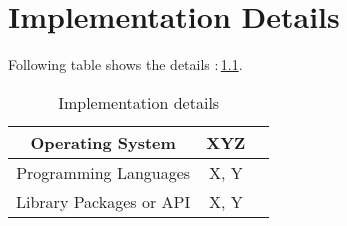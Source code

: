 \chapter{Implementation Details}

Following table shows the details :\,\ref{tab:terminology}.

\begin{table}[hbt!]
\begin{center}
\begin{tabular}{||c||c|c|}
\hline
Operating System & XYZ\\ 
\hline
Programming Languages & X, Y \\
\hline
Library Packages or API & X, Y \\
\hline
\end{tabular}
\caption{\label{tab:terminology} Implementation details}
\end{center}
\end{table}
